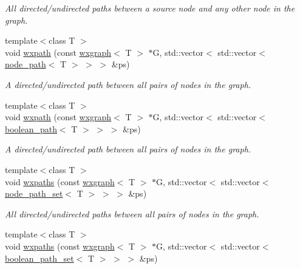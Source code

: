 \begin{DoxyCompactItemize}
\begin{DoxyCompactList}\small\item\em All directed/undirected paths between a source node and any other node in the graph. \end{DoxyCompactList}\item 
{\footnotesize template$<$class T $>$ }\\void \hyperlink{namespacelgraph_1_1traversal_a4df6479cb82c8039a26f5ea6f7a7d492}{wxpath} (const \hyperlink{classlgraph_1_1wxgraph}{wxgraph}$<$ T $>$ $\ast$G, std\-::vector$<$ std\-::vector$<$ \hyperlink{classlgraph_1_1node__path}{node\-\_\-path}$<$ T $>$ $>$ $>$ \&ps)
\begin{DoxyCompactList}\small\item\em A directed/undirected path between all pairs of nodes in the graph. \end{DoxyCompactList}\item 
{\footnotesize template$<$class T $>$ }\\void \hyperlink{namespacelgraph_1_1traversal_aec3005313c7f91c77e0f491856ddea71}{wxpath} (const \hyperlink{classlgraph_1_1wxgraph}{wxgraph}$<$ T $>$ $\ast$G, std\-::vector$<$ std\-::vector$<$ \hyperlink{classlgraph_1_1boolean__path}{boolean\-\_\-path}$<$ T $>$ $>$ $>$ \&ps)
\begin{DoxyCompactList}\small\item\em A directed/undirected path between all pairs of nodes in the graph. \end{DoxyCompactList}\item 
{\footnotesize template$<$class T $>$ }\\void \hyperlink{namespacelgraph_1_1traversal_a5b6e18906e47ee3a820d1bf676e61156}{wxpaths} (const \hyperlink{classlgraph_1_1wxgraph}{wxgraph}$<$ T $>$ $\ast$G, std\-::vector$<$ std\-::vector$<$ \hyperlink{namespacelgraph_a0570ce57129123d5816913d287f6cc73}{node\-\_\-path\-\_\-set}$<$ T $>$ $>$ $>$ \&ps)
\begin{DoxyCompactList}\small\item\em All directed/undirected paths between all pairs of nodes in the graph. \end{DoxyCompactList}\item 
{\footnotesize template$<$class T $>$ }\\void \hyperlink{namespacelgraph_1_1traversal_aa9f18da0801c5d0401b1be463032d22c}{wxpaths} (const \hyperlink{classlgraph_1_1wxgraph}{wxgraph}$<$ T $>$ $\ast$G, std\-::vector$<$ std\-::vector$<$ \hyperlink{namespacelgraph_afad432931ba600ab1628d5c9595986c5}{boolean\-\_\-path\-\_\-set}$<$ T $>$ $>$ $>$ \&ps)

\end{DoxyCompactItemize}
